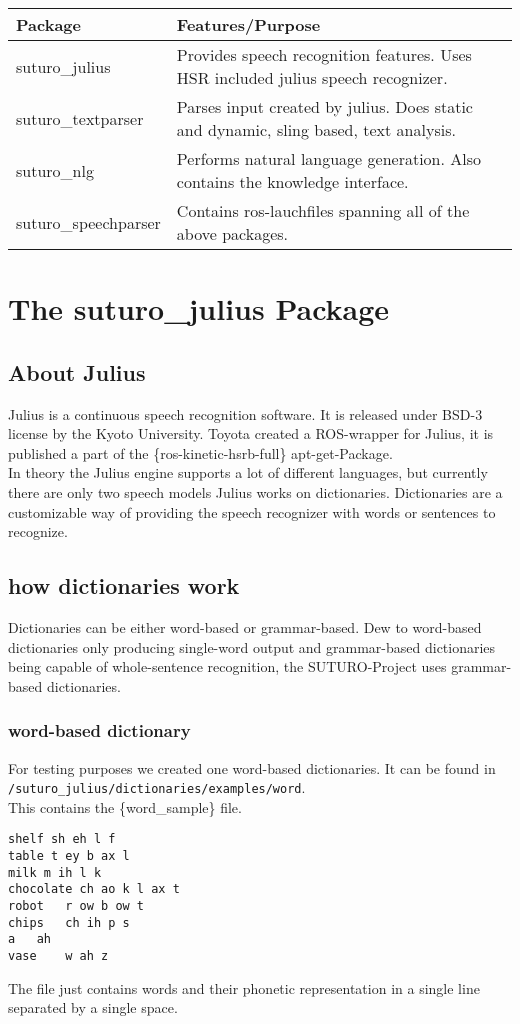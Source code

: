 \documentclass[main.tex]{subfiles}
\begin{document}
    \begin{tabular}{|l|p{9cm}|}
        \hline
        \textbf{Package} & \textbf{Features/Purpose} \\
        \hline
        suturo\_julius & Provides speech recognition features. Uses HSR included julius speech recognizer. \\
        \hline 
        suturo\_textparser & Parses input created by julius. Does static and dynamic, sling based, text analysis. \\
        \hline
        suturo\_nlg & Performs natural language generation. Also contains the knowledge interface. \\
        \hline 
        suturo\_speechparser & Contains ros-lauchfiles spanning all of the above packages.\\
        \hline
    \end{tabular}

\newpage
\section{The suturo\_julius Package}

    \subsection{About Julius}
      Julius is a continuous speech recognition software. It is released under BSD-3 license by the Kyoto University. Toyota created a ROS-wrapper for Julius, it is published a part of the \{ros-kinetic-hsrb-full\} apt-get-Package.\\
      In theory the Julius engine supports a lot of different languages, but currently there are only two speech models
     Julius works on dictionaries. Dictionaries are a customizable way of providing the speech recognizer with words or sentences to recognize.
    \subsection{how dictionaries work}
      Dictionaries can be either word-based or grammar-based. Dew to word-based dictionaries only producing single-word output and grammar-based dictionaries being capable of whole-sentence recognition, the SUTURO-Project uses grammar-based dictionaries.
    
        \subsubsection{word-based dictionary}
            For testing purposes we created one word-based dictionaries. It can be found in \lstinline|/suturo_julius/dictionaries/examples/word|.\\
            This contains the \{word\_sample\} file.\\
            \begin{lstlisting}
shelf sh eh l f
table t ey b ax l
milk m ih l k
chocolate ch ao k l ax t
robot	r ow b ow t
chips	ch ih p s
a	ah
vase	w ah z
            \end{lstlisting}
            The file just contains words and their phonetic representation in a single line separated by a single space.
            
\end{document}
